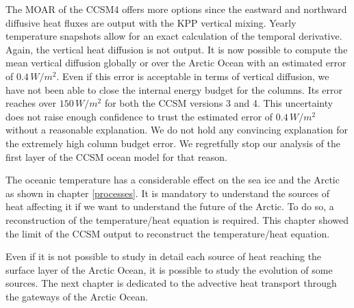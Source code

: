 The MOAR of the CCSM4 offers more options since the eastward and northward diffusive heat fluxes are output with the KPP vertical mixing. Yearly temperature snapshots allow for an exact calculation of the temporal derivative. Again, the vertical heat diffusion is not output. It is now possible to compute the mean vertical diffusion globally or over the Arctic Ocean with an estimated error of $0.4\,W/m^2$. Even if this error is acceptable in terms of vertical diffusion, we have not been able to close the internal energy budget for the columns. Its error reaches over $150\,W/m^2$ for both the CCSM versions 3 and 4. This uncertainty does not raise enough confidence to trust the estimated error of $0.4\,W/m^2$ without a reasonable explanation. We do not hold any convincing explanation for the extremely high column budget error. We regretfully stop our analysis of the first layer of the CCSM ocean model for that reason. 

The oceanic temperature has a considerable effect on the sea ice and the Arctic as shown in chapter \ref{processes}. It is mandatory to understand the sources of heat affecting it if we want to understand the future of the Arctic. To do so, a reconstruction of the temperature/heat equation is required. This chapter showed the limit of the CCSM output to reconstruct the temperature/heat equation.

Even if it is not possible to study in detail each source of heat reaching the surface layer of the Arctic Ocean, it is possible to study the evolution of some sources. The next chapter is dedicated to the advective heat transport through the gateways of the Arctic Ocean. 






